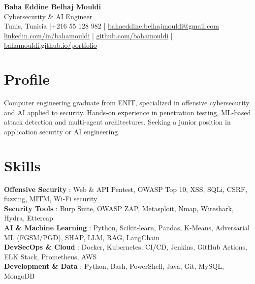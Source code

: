 \documentclass[a4paper,10pt]{article}
\begin{document}
\begin{center}
  {\LARGE\bfseries\color{navy} Baha Eddine Belhaj Mouldi}\\[4pt]
  {\large Cybersecurity \& AI Engineer}\\[6pt]
  \normalsize
  Tunis, Tunisia \quad|\quad +216 55 128 982 \quad|\quad
  \href{mailto:bahaeddine.belhajmouldi@gmail.com}{bahaeddine.belhajmouldi@gmail.com}\\[2pt]
  \href{https://www.linkedin.com/in/bahamouldi}{linkedin.com/in/bahamouldi} \quad|\quad
  \href{https://github.com/bahamouldi}{github.com/bahamouldi} \quad|\quad
  \href{https://bahamouldi.github.io/portfolio/}{bahamouldi.github.io/portfolio}
\end{center}
\vspace{4pt}
\section{Profile}
Computer engineering graduate from ENIT, specialized in offensive cybersecurity and AI applied to security. Hands-on experience in penetration testing, ML-based attack detection and multi-agent architectures. Seeking a junior position in application security or AI engineering.
\section{Skills}
\textbf{Offensive Security} : Web \& API Pentest, OWASP Top 10, XSS, SQLi, CSRF, fuzzing, MITM, Wi-Fi security\\[2pt]
\textbf{Security Tools} : Burp Suite, OWASP ZAP, Metasploit, Nmap, Wireshark, Hydra, Ettercap\\[2pt]
\textbf{AI \& Machine Learning} : Python, Scikit-learn, Pandas, K-Means, Adversarial ML (FGSM/PGD), SHAP, LLM, RAG, LangChain\\[2pt]
\textbf{DevSecOps \& Cloud} : Docker, Kubernetes, CI/CD, Jenkins, GitHub Actions, ELK Stack, Prometheus, AWS\\[2pt]
\textbf{Development \& Data} : Python, Bash, PowerShell, Java, Git, MySQL, MongoDB
\end{document}
